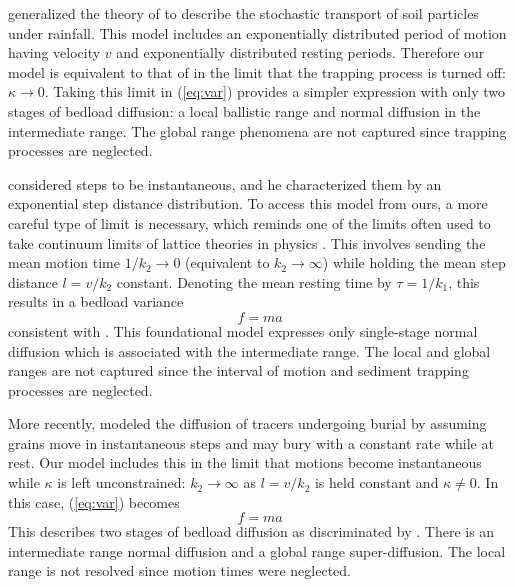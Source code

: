 \documentclass[]{agujournal2018}
\newcommand\be{\begin{equation}}
\newcommand\ee{\end{equation}}
\begin{document}
\citet{Lisle1998} generalized the theory of \citet{Einstein1937} to describe the stochastic transport of soil particles under rainfall.
This model includes an exponentially distributed period of motion having velocity $v$ and exponentially distributed resting periods.
Therefore our model is equivalent to that of \citet{Lisle1998} in the limit that the trapping process is turned off: $\kappa \rightarrow 0$.
Taking this limit in (\ref{eq:var}) provides a simpler expression with only two stages of bedload diffusion: a local ballistic range and normal diffusion in the intermediate range. The global range phenomena are not captured since trapping processes are neglected.

\citet{Einstein1937} considered steps to be instantaneous, and he characterized them by an exponential step distance distribution.
To access this model from ours, a more careful type of limit is necessary, which reminds one of the limits often used to take continuum limits of lattice theories in physics \citep[e.g.][]{Goldstein1980, Weiss1994}.
This involves sending the mean motion time $1/k_2 \rightarrow 0 $ (equivalent to $k_2 \rightarrow \infty$) while holding the mean step distance $l = v/k_2$ constant.
Denoting the mean resting time by $\tau = 1/k_1$, this results in a bedload variance
\be f=ma \ee
consistent with \citet{Einstein1937}.
This foundational model expresses only single-stage normal diffusion which is associated with the intermediate range. 
The local and global ranges are not captured since the interval of motion and sediment trapping processes are neglected.

More recently, \citet{Wu2019} modeled the diffusion of tracers undergoing burial by assuming grains move in instantaneous steps and may bury with a constant rate while at rest.
Our model includes this in the limit that motions become instantaneous while $\kappa$ is left unconstrained: $k_2 \rightarrow \infty$ as $l = v/k_2$ is held constant and $\kappa \neq 0$.
In this case, (\ref{eq:var}) becomes
\be f=ma \ee
This describes two stages of bedload diffusion as discriminated by \citet{Wu2019}.
There is an intermediate range normal diffusion and a global range super-diffusion.
The local range is not resolved since motion times were neglected.
\end{document}
